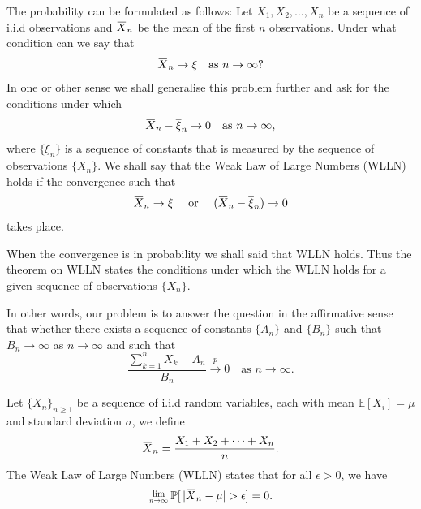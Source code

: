 The probability can be formulated as follows: Let $X_1, X_2, \ldots, X_n$ be a sequence of i.i.d observations and $\ols{X}_n$ 
be the mean of the first $n$ observations. Under what condition can we say that 
\[
    \ols{X}_n \to \xi \quad \text{as } n \to \infty?
\]
In one or other sense we shall generalise this problem further and ask for the conditions under which
\[
    \ols{X}_n - \overline{\xi}_n \to 0 \quad \text{as } n \to \infty,
\]
where $\{\xi_n \}$ is a sequence of constants that is measured by the sequence of observations $\{X_n \}$.
We shall say that the Weak Law of Large Numbers (WLLN) holds if the convergence such that 
\begin{equation}
    \ols{X}_n \to \xi \quad \text{ or } \quad (\ols{X}_n - \overline{\xi}_n) \to 0 
\end{equation}
takes place.

When the convergence is in probability we shall said that WLLN holds. Thus the theorem on WLLN states the 
conditions under which the WLLN holds for a given sequence of observations $\{X_n \}$.

In other words, our problem is to answer the question in the affirmative sense that whether there exists 
a sequence of constants $\{A_n \}$ and $\{B_n \}$ such that $B_n \to \infty$ as $n \to \infty$ and such that 
\begin{equation}
    \frac{\sum^n_{k=1} X_k - A_n}{B_n} \xrightarrow[]{p} 0 \quad \text{as } n \to \infty.
\end{equation}

\begin{theorem}
    Let $\{X_n\}_{n \geq 1}$ be a sequence of i.i.d random variables, each with mean 
    $\mathbb{E}[X_i] = \mu$ and standard deviation $\sigma$, we define 
    \[
        \ols{X}_n = \frac{X_1 + X_2 + \cdots + X_n}{n}.
    \]
    The Weak Law of Large Numbers (WLLN) states that for all $\epsilon > 0$, we have 
    \begin{equation}
        \Lim{n \to \infty} \mathbb{P}[\, |\ols{X}_n - \mu| > \epsilon] = 0.
    \end{equation}
\end{theorem}

